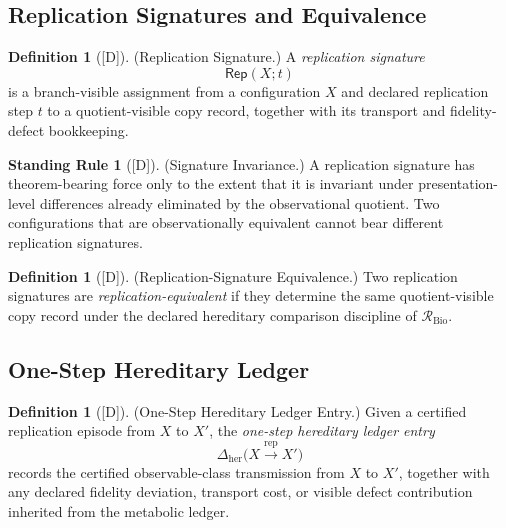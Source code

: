 \documentclass[12pt,oneside]{amsbook}
\theoremstyle{plain}
\theoremstyle{definition}
\newtheorem{definition}[theorem]{Definition}
\newtheorem{standingrule}[theorem]{Standing Rule}
\theoremstyle{remark}
\newcommand{\status}[1]{\textup{[#1]}}
\begin{document}
\subsection{Replication Signatures and Equivalence}\label{sec:bio-signatures}

\begin{definition}[\status{D}]\label{def:bio-rep-signature}
\textup{(Replication Signature.)}
A \emph{replication signature}
\[
 \mathsf{Rep}(X; t)
\]
is a branch-visible assignment from a configuration $X$ and declared
replication step $t$ to a quotient-visible copy record, together with
its transport and fidelity-defect bookkeeping.
\end{definition}

\begin{standingrule}[\status{D}]\label{sr:bio-signature-invariance}
\textup{(Signature Invariance.)}
A replication signature has theorem-bearing force only to the extent
that it is invariant under presentation-level differences already
eliminated by the observational quotient. Two configurations that
are observationally equivalent cannot bear different replication
signatures.
\end{standingrule}

\begin{definition}[\status{D}]\label{def:bio-rep-equivalence}
\textup{(Replication-Signature Equivalence.)}
Two replication signatures are \emph{replication-equivalent} if they
determine the same quotient-visible copy record under the declared
hereditary comparison discipline of $\mathcal{R}_{\mathrm{Bio}}$.
\end{definition}

\subsection{One-Step Hereditary Ledger}\label{sec:bio-hereditary-ledger}

\begin{definition}[\status{D}]\label{def:bio-one-step-heredity}
\textup{(One-Step Hereditary Ledger Entry.)}
Given a certified replication episode from $X$ to $X'$, the
\emph{one-step hereditary ledger entry}
\[
 \Delta_{\mathrm{her}}\!\bigl(X \xrightarrow{\mathrm{rep}} X'\bigr)
\]
records the certified observable-class transmission from $X$ to $X'$,
together with any declared fidelity deviation, transport cost, or
visible defect contribution inherited from the metabolic ledger.
\end{definition}
\end{document}
